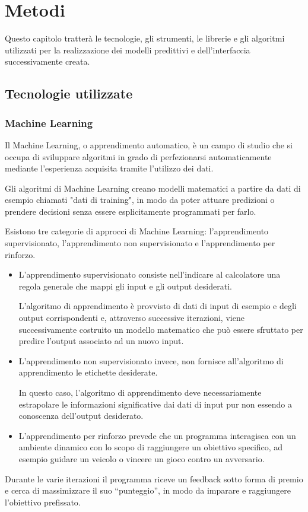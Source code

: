 \chapter{Metodi}
Questo capitolo tratterà le tecnologie, gli strumenti, le librerie e gli algoritmi utilizzati per la realizzazione dei modelli predittivi e dell’interfaccia successivamente creata. 
\section{Tecnologie utilizzate}
\subsection{Machine Learning}

Il Machine Learning, o apprendimento automatico, è un campo di studio che si occupa di sviluppare algoritmi in grado di perfezionarsi automaticamente mediante l'esperienza acquisita tramite l'utilizzo dei dati. 

Gli algoritmi di Machine Learning creano modelli matematici a partire da dati di esempio chiamati "dati di training", in modo da poter attuare predizioni o prendere decisioni senza essere esplicitamente programmati per farlo. 

Esistono tre categorie di approcci di Machine Learning: l'apprendimento supervisionato, l'apprendimento non supervisionato e l'apprendimento per rinforzo.
\begin{itemize}
    \item L'apprendimento supervisionato consiste nell’indicare al calcolatore una regola generale che mappi gli input e gli output desiderati. 
    
    L'algoritmo di apprendimento è provvisto di dati di input di esempio e degli output corrispondenti e, attraverso successive iterazioni, viene successivamente costruito un modello matematico che può essere sfruttato per predire l'output associato ad un nuovo input.
    
    \item L'apprendimento non supervisionato invece, non fornisce all'algoritmo di apprendimento le etichette desiderate. 
    
    In questo caso, l'algoritmo di apprendimento deve necessariamente estrapolare le informazioni significative dai dati di input pur non essendo a conoscenza dell'output desiderato.
    
    \item L'apprendimento per rinforzo prevede che un programma interagisca con un ambiente dinamico con lo scopo di raggiungere un obiettivo specifico, ad esempio guidare un veicolo o vincere un gioco contro un avversario. 
\end{itemize}
Durante le varie iterazioni il programma riceve un feedback sotto forma di premio e cerca di massimizzare il suo “punteggio”, in modo da imparare e raggiungere l'obiettivo prefissato.

